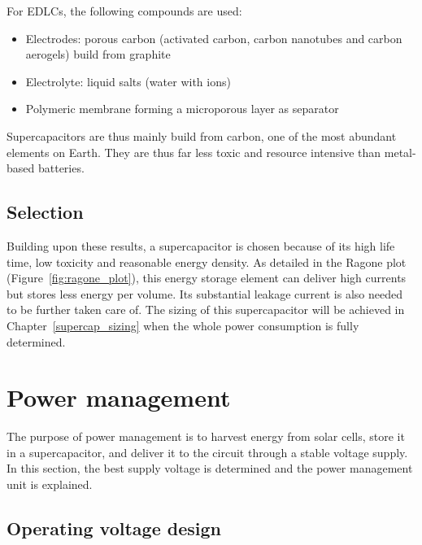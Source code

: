 \documentclass{EPL-master-thesis-covers-EN}
\begin{document}
For EDLCs, the following compounds are used:

\begin{itemize}
 \item Electrodes: porous carbon (activated carbon, carbon nanotubes and carbon aerogels) build from graphite \cite{Hastak}
 \item Electrolyte: liquid salts (water with ions)
 \item Polymeric membrane forming a microporous layer as separator
\end{itemize}

Supercapacitors are thus mainly build from carbon, one of the most abundant elements on Earth. They are thus far less toxic and resource intensive than metal-based batteries.

    
\section{Selection}

Building upon these results, a supercapacitor is chosen because of its high life time, low toxicity and reasonable energy density. As detailed in the Ragone plot (Figure~\ref{fig:ragone_plot}), this energy storage element can deliver high currents but stores less energy per volume. Its substantial leakage current is also needed to be further taken care of. The sizing of this supercapacitor will be achieved in Chapter~\ref{supercap_sizing} when the whole power consumption is fully determined. 


\chapter{Power management}

The purpose of power management is to harvest energy from solar cells, store it in a supercapacitor, and deliver it to the circuit through a stable voltage supply. In this section, the best supply voltage is determined and the power management unit is explained.

\section{Operating voltage design}
\label{section:operating_voltage}
\end{document}
